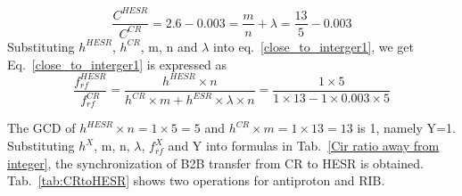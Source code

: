 \begin{equation}
\frac{C^{HESR}}{C^{CR}}=2.6-0.003=\frac{m}{n}+ \lambda = \frac{13}{5}-0.003
\end{equation}
Substituting $h^{HESR}$, $h^{CR}$, m, n and $\lambda$ into eq.~\ref{close_to_interger1}, we get
Eq.~\ref{close_to_interger1} is expressed as
\begin{equation} 
\frac{f_{rf}^{HESR}}{f_{rf}^{CR}}=\frac{h^{HESR}\times n}{h^{CR} \times m+ h^{ESR} \times\lambda\times n}=\frac{1\times 5}{1 \times 13- 1 \times 0.003\times 5}
\end{equation}

The GCD of $h^{HESR}\times n=1\times5=5$ and $h^{CR} \times m=1\times 13=13$ is 1, namely Y=1. Substituting $h^X$, m, n, $\lambda$, $f_{rf}^{X}$ and Y into formulas in Tab.~\ref{Cir ratio away from integer}, the synchronization of B2B transfer from CR to HESR is obtained. Tab.~\ref{tab:CRtoHESR} shows two operations for antiproton and RIB.


